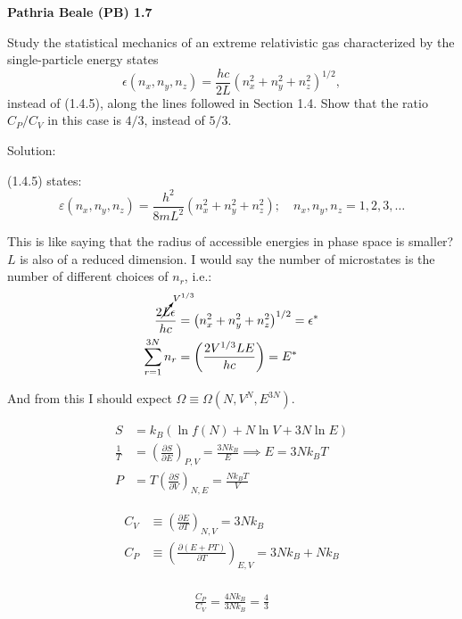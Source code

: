 \newpage
\begin{homeworkProblem}
    \textbf{Pathria Beale (PB) 1.7}

    Study the statistical mechanics of an extreme relativistic gas characterized by the
    single-particle energy states
    \[
        \epsilon(n_x,n_y,n_z)
        =
        \frac{hc}{2L}
        \left(n_x^2+n_y^2+n_z^2\right)^{1/2},
    \]
    instead of (1.4.5), along the lines followed in Section 1.4. Show that the ratio
    $C_P/C_V$ in this case is $4/3$, instead of $5/3$.

    \begin{callout}{Solution:}

        (1.4.5) states:
        $$ \varepsilon\left(n_x, n_y, n_z\right)=\frac{h^2}{8 m L^2}\left(n_x^2+n_y^2+n_z^2\right) ; \quad n_x, n_y, n_z=1,2,3, \ldots $$

        This is like saying that the radius of accessible energies in phase space is smaller? $L$ is also of a reduced dimension. I would say the number of microstates is the number of different choices of $n_r$, i.e.:
        \begin{align*}
            \frac{2\cancelto{V^{{1} / {3}}}{L}\epsilon}{hc} &= \left(n_x^2+n_y^2+n_z^2\right)^{1 / 2} = \epsilon^{*} \\ 
            \sum_{r=1}^{3N} n_r &= \left( \frac{2V^{{1} / {3}}{L}E}{hc} \right) = E^{*}
        \end{align*}

        And from this I should expect $\Omega \equiv \Omega(N, V^{N}, E^{3N})$.

        \begin{align*}
            S &= k_B \left( \ln f(N) + N \ln V + 3N \ln E \right) \\
            \frac{1}{T} &= \left( \frac{\partial S}{\partial E} \right)_{P,V} = \frac{3Nk_B}{E} \implies E=3Nk_BT \\
            P &= T\left( \frac{\partial S}{\partial V} \right)_{N,E} = \frac{Nk_BT}{V}
        \end{align*}

        \begin{align*}
            C_V &\equiv \left( \frac{\partial E}{\partial T} \right)_{N,V} = 3Nk_B\\
            C_P &\equiv \left( \frac{\partial (E+PT)}{\partial T} \right)_{E,V} = 3Nk_B + Nk_B\\
        \end{align*}

        \begin{align*}
            \boxed{\frac{C_P}{C_V} =\frac{4 Nk_B}{3 Nk_B} = \frac{4}{3}
}
        \end{align*}

    \end{callout}

\end{homeworkProblem}

